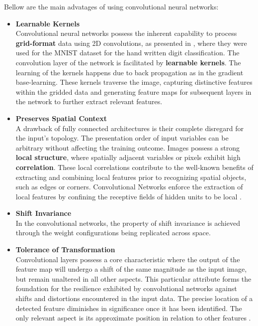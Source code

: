 Bellow are the main advatages of using convolutional neural networks:
\begin{itemize}
    \item \textbf{Learnable Kernels}\\
          Convolutional neural networks possess the inherent capability to process \textbf{grid-format} data using 2D convolutions, as presented in \cite{LeChun_5}, where they were used for the MNIST dataset\cite{deng2012mnist} for the hand written digit classification.
          The convolution layer of the network is facilitated by \textbf{learnable kernels}. The learning of the kernels happens due to back propagation as in the gradient base-learning.
          These kernels traverse the image, capturing distinctive features within the gridded data and generating feature maps for subsequent layers in the network to further extract relevant features.

\end{itemize}
\begin{itemize}
    \item \textbf{Preserves Spatial Context }\\
          A drawback of fully connected architectures is their complete disregard for the input's topology. The presentation order of input variables can be arbitrary without affecting the training outcome. Images possess a strong \textbf{local structure}, where spatially adjacent variables or pixels exhibit high \textbf{correlation}. These local correlations contribute to the well-known benefits of extracting and combining local features prior to recognizing spatial objects, such as edges or corners. Convolutional Networks enforce the extraction of local features
          by confining the receptive fields of hidden units to be local \cite{LeChun_5}.
\end{itemize}

\begin{itemize}
    \item \textbf{Shift Invariance}\\
          In the convolutional networks, the property of shift invariance is achieved through the weight configurations being replicated across space\cite{LeChun_5}.

\end{itemize}
\begin{itemize}
    \item \textbf{Tolerance of Transformation }\\
          Convolutional layers possess a core characteristic where the output of the feature map will undergo a shift of the same magnitude as the input image, but remain unaltered in all other aspects. This particular attribute forms the foundation for the resilience exhibited by convolutional networks against shifts and distortions encountered in the input data\cite{LeChun_5}.
          The precise location of a detected feature diminishes in significance once it has been identified. The only relevant aspect is its approximate position in relation to other features \cite{LeChun_5}.
\end{itemize}


